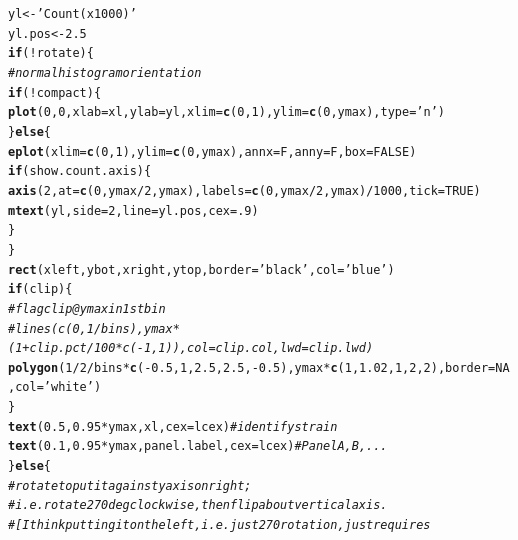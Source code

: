 \documentclass{article}\usepackage[]{graphicx}\usepackage[]{color}
\makeatletter
\newcommand{\hlnum}[1]{\textcolor[rgb]{0.686,0.059,0.569}{#1}}%
\newcommand{\hlstr}[1]{\textcolor[rgb]{0.192,0.494,0.8}{#1}}%
\newcommand{\hlcom}[1]{\textcolor[rgb]{0.678,0.584,0.686}{\textit{#1}}}%
\newcommand{\hlopt}[1]{\textcolor[rgb]{0,0,0}{#1}}%
\newcommand{\hlstd}[1]{\textcolor[rgb]{0.345,0.345,0.345}{#1}}%
\newcommand{\hlkwa}[1]{\textcolor[rgb]{0.161,0.373,0.58}{\textbf{#1}}}%
\newcommand{\hlkwb}[1]{\textcolor[rgb]{0.69,0.353,0.396}{#1}}%
\newcommand{\hlkwc}[1]{\textcolor[rgb]{0.333,0.667,0.333}{#1}}%
\newcommand{\hlkwd}[1]{\textcolor[rgb]{0.737,0.353,0.396}{\textbf{#1}}}%
\newenvironment{kframe}{%
 \def\at@end@of@kframe{}%
 \ifinner\ifhmode%
  \def\at@end@of@kframe{\end{minipage}}%
  \begin{minipage}{\columnwidth}%
 \fi\fi%
 \def\FrameCommand##1{\hskip\@totalleftmargin \hskip-\fboxsep
 \colorbox{shadecolor}{##1}\hskip-\fboxsep
     \hskip-\linewidth \hskip-\@totalleftmargin \hskip\columnwidth}%
 \MakeFramed {\advance\hsize-\width
   \@totalleftmargin\z@ \linewidth\hsize
   \@setminipage}}%
 {\par\unskip\endMakeFramed%
 \at@end@of@kframe}
\newenvironment{knitrout}{}{} %
\makeatother
\begin{document}
\begin{knitrout}
\begin{kframe}
\begin{alltt}
  \hlstd{yl} \hlkwb{<-} \hlstr{'Count (x 1000)'}
  \hlstd{yl.pos} \hlkwb{<-} \hlnum{2.5}
  \hlkwa{if}\hlstd{(}\hlopt{!}\hlstd{rotate)\{}
    \hlcom{# normal histogram orientation}
    \hlkwa{if}\hlstd{(}\hlopt{!}\hlstd{compact)\{}
      \hlkwd{plot}\hlstd{(}\hlnum{0}\hlstd{,}\hlnum{0}\hlstd{,} \hlkwc{xlab}\hlstd{=xl,} \hlkwc{ylab}\hlstd{=yl,} \hlkwc{xlim}\hlstd{=}\hlkwd{c}\hlstd{(}\hlnum{0}\hlstd{,}\hlnum{1}\hlstd{),} \hlkwc{ylim}\hlstd{=}\hlkwd{c}\hlstd{(}\hlnum{0}\hlstd{,ymax),} \hlkwc{type}\hlstd{=}\hlstr{'n'}\hlstd{)}
    \hlstd{\}} \hlkwa{else} \hlstd{\{}
      \hlkwd{eplot}\hlstd{(}\hlkwc{xlim}\hlstd{=}\hlkwd{c}\hlstd{(}\hlnum{0}\hlstd{,}\hlnum{1}\hlstd{),} \hlkwc{ylim}\hlstd{=}\hlkwd{c}\hlstd{(}\hlnum{0}\hlstd{,ymax),} \hlkwc{annx}\hlstd{=F,} \hlkwc{anny}\hlstd{=F,} \hlkwc{box}\hlstd{=}\hlnum{FALSE}\hlstd{)}
      \hlkwa{if}\hlstd{(show.count.axis)\{}
        \hlkwd{axis}\hlstd{(}\hlnum{2}\hlstd{,} \hlkwc{at}\hlstd{=}\hlkwd{c}\hlstd{(}\hlnum{0}\hlstd{,ymax}\hlopt{/}\hlnum{2}\hlstd{,ymax),} \hlkwc{labels}\hlstd{=}\hlkwd{c}\hlstd{(}\hlnum{0}\hlstd{,ymax}\hlopt{/}\hlnum{2}\hlstd{,ymax)}\hlopt{/}\hlnum{1000}\hlstd{,} \hlkwc{tick}\hlstd{=}\hlnum{TRUE}\hlstd{)}
        \hlkwd{mtext}\hlstd{(yl,} \hlkwc{side}\hlstd{=}\hlnum{2}\hlstd{,} \hlkwc{line}\hlstd{=yl.pos,} \hlkwc{cex}\hlstd{=}\hlnum{.9}\hlstd{)}
      \hlstd{\}}
    \hlstd{\}}
    \hlkwd{rect}\hlstd{(xleft,ybot,xright,ytop,}\hlkwc{border}\hlstd{=}\hlstr{'black'}\hlstd{,}\hlkwc{col}\hlstd{=}\hlstr{'blue'}\hlstd{)}
    \hlkwa{if}\hlstd{(clip)\{}
      \hlcom{# flag clip @ ymax in 1st bin}
      \hlcom{#lines(c(0,1/bins),ymax*(1+clip.pct/100*c(-1,1)),col=clip.col,lwd=clip.lwd)}
      \hlkwd{polygon}\hlstd{(}\hlnum{1}\hlopt{/}\hlnum{2}\hlopt{/}\hlstd{bins}\hlopt{*}\hlkwd{c}\hlstd{(}\hlopt{-}\hlnum{0.5}\hlstd{,}\hlnum{1}\hlstd{,}\hlnum{2.5}\hlstd{,}\hlnum{2.5}\hlstd{,}\hlopt{-}\hlnum{0.5}\hlstd{), ymax}\hlopt{*}\hlkwd{c}\hlstd{(}\hlnum{1}\hlstd{,}\hlnum{1.02}\hlstd{,}\hlnum{1}\hlstd{,}\hlnum{2}\hlstd{,}\hlnum{2}\hlstd{),} \hlkwc{border}\hlstd{=}\hlnum{NA}\hlstd{,} \hlkwc{col}\hlstd{=}\hlstr{'white'}\hlstd{)}
    \hlstd{\}}
    \hlkwd{text}\hlstd{(}\hlnum{0.5}\hlstd{,} \hlnum{0.95}\hlopt{*}\hlstd{ymax, xl,} \hlkwc{cex}\hlstd{=lcex)}            \hlcom{# identify strain}
    \hlkwd{text}\hlstd{(}\hlnum{0.1}\hlstd{,} \hlnum{0.95}\hlopt{*}\hlstd{ymax, panel.label,} \hlkwc{cex}\hlstd{=lcex)}   \hlcom{# Panel A, B, ...}
  \hlstd{\}} \hlkwa{else} \hlstd{\{}
    \hlcom{# rotate to put it against y axis on right; }
    \hlcom{# i.e. rotate 270 deg clockwise, then flip about vertical axis.}
    \hlcom{# [I think putting it on the left, i.e. just 270 rotation, just requires }

\end{alltt}
\end{kframe}
\end{knitrout}
\end{document}
